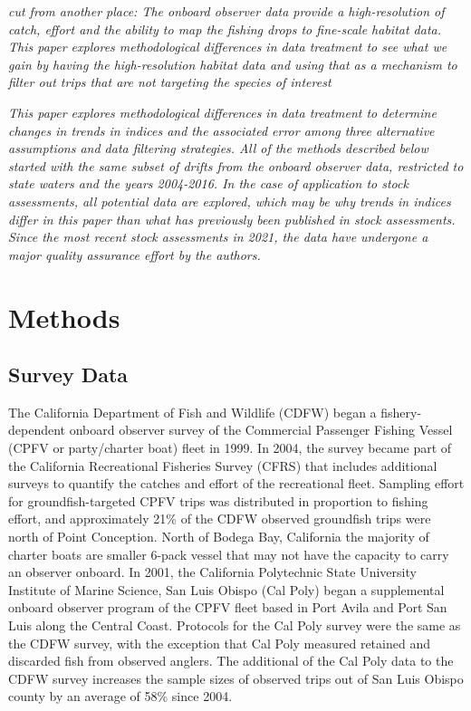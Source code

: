 \documentclass[
  authoryear,
  preprint,
  3p]{elsarticle}
\begin{document}
\emph{cut from another place: The onboard observer data provide a
high-resolution of catch, effort and the ability to map the fishing
drops to fine-scale habitat data. This paper explores methodological
differences in data treatment to see what we gain by having the
high-resolution habitat data and using that as a mechanism to filter out
trips that are not targeting the species of interest}

\emph{This paper explores methodological differences in data treatment
to determine changes in trends in indices and the associated error among
three alternative assumptions and data filtering strategies. All of the
methods described below started with the same subset of drifts from the
onboard observer data, restricted to state waters and the years
2004-2016. In the case of application to stock assessments, all
potential data are explored, which may be why trends in indices differ
in this paper than what has previously been published in stock
assessments. Since the most recent stock assessments in 2021, the data
have undergone a major quality assurance effort by the authors.}

\hypertarget{methods}{%
\section{Methods}\label{methods}}

\hypertarget{survey-data}{%
\subsection{Survey Data}\label{survey-data}}

The California Department of Fish and Wildlife (CDFW) began a
fishery-dependent onboard observer survey of the Commercial Passenger
Fishing Vessel (CPFV or party/charter boat) fleet in 1999. In 2004, the
survey became part of the California Recreational Fisheries Survey
(CFRS) that includes additional surveys to quantify the catches and
effort of the recreational fleet. Sampling effort for
groundfish-targeted CPFV trips was distributed in proportion to fishing
effort, and approximately 21\% of the CDFW observed groundfish trips
were north of Point Conception. North of Bodega Bay, California the
majority of charter boats are smaller 6-pack vessel that may not have
the capacity to carry an observer onboard. In 2001, the California
Polytechnic State University Institute of Marine Science, San Luis
Obispo (Cal Poly) began a supplemental onboard observer program of the
CPFV fleet based in Port Avila and Port San Luis along the Central
Coast. Protocols for the Cal Poly survey were the same as the CDFW
survey, with the exception that Cal Poly measured retained and discarded
fish from observed anglers. The additional of the Cal Poly data to the
CDFW survey increases the sample sizes of observed trips out of San Luis
Obispo county by an average of 58\% since 2004.
\end{document}
